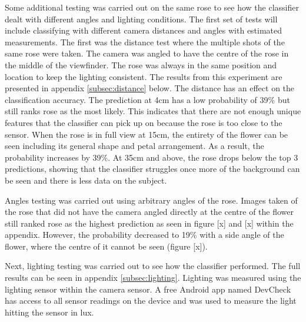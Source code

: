 \documentclass[12pt,a4paper]{report}
\begin{document}
Some additional testing was carried out on the same rose to see how the classifier dealt with different angles and 
lighting conditions. The first set of tests will include classifying with different camera distances and angles with 
estimated measurements. The first was the distance test where the multiple shots of the same rose were taken. The camera
was angled to have the centre of the rose in the middle of the viewfinder. The rose was always in the same position and 
location to keep the lighting consistent. The results from this experiment are presented in appendix 
\ref{subsec:distance} below. The distance has an effect on the classification accuracy. The prediction at 4cm has a low probability of 39\% but still
ranks rose as the most likely. This indicates that there are not enough unique features that the classifier can pick up 
on because the rose is too close to the sensor. When the rose is in full view at 15cm, the entirety of the flower can be
seen including its general shape and petal arrangement. As a result, the probability increases by 39\%. At 35cm 
and above, the rose drops below the top 3 predictions, showing that the classifier struggles once more of the 
background can be seen and there is less data on the subject.

\par

Angles testing was carried out using arbitrary angles of the rose. Images taken of the rose that did not have the camera
angled directly at the centre of the flower still ranked rose as the highest prediction as seen in figure [x] and 
[x] within the appendix. However, the probability decreased to 19\% with a side angle of the flower, where the centre of
it cannot be seen (figure [x]).

\par

Next, lighting testing was carried out to see how the classifier performed. The full results can be seen in appendix 
\ref{subsec:lighting}. Lighting was measured using the lighting 
sensor within the camera sensor. A free Android app named DevCheck \citep{GooglePlayDevCheck} has access to all sensor 
readings on the device and was used to measure the light hitting the sensor in lux.
\end{document}
